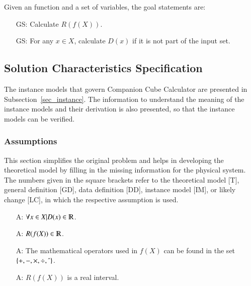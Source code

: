 \documentclass[12pt]{article}
\newcounter{assumpnum} %
\newcounter{goalnum} %
\newcommand{\progname}{Companion Cube Calculator} %
\begin{document}
\noindent Given an function and a set of variables, the goal statements are:

\begin{itemize}

\item[GS\refstepcounter{goalnum}\thegoalnum \label{G_range}:] 
Calculate $R(f(X))$.

\item[GS\refstepcounter{goalnum}\thegoalnum \label{G_unknownDomain}:] 
For any $x \in X$, calculate $D(x)$ if it is not part of the input set.

\end{itemize}

\subsection{Solution Characteristics Specification}
The instance models that govern \progname{} are presented in
Subsection~\ref{sec_instance}. The information to understand the meaning of the
instance models and their derivation is also presented, so that the instance
models can be verified.

\subsubsection{Assumptions}
This section simplifies the original problem and helps in developing the
theoretical model by filling in the missing information for the physical
system. The numbers given in the square brackets refer to the theoretical model
[T], general definition [GD], data definition [DD], instance model [IM], or
likely change [LC], in which the respective assumption is used.

\begin{itemize}

\item[A\refstepcounter{assumpnum}\theassumpnum \label{A_domain}:] $\forall x 
\in X | D(x) \in \varmathbb{R}$.

\item[A\refstepcounter{assumpnum}\theassumpnum \label{A_range}:] $R(f(X)) \in 
\varmathbb{R}$.

\item[A\refstepcounter{assumpnum}\theassumpnum \label{A_operators}:] The 
mathematical operators used in $f(X)$ can be found in the set $\{+, -, 
\times, \div, \string^ \}$.

\item[A\refstepcounter{assumpnum}\theassumpnum \label{A_interval}:] $R(f(X))$ 
is a real interval.

\end{itemize}
\end{document}
